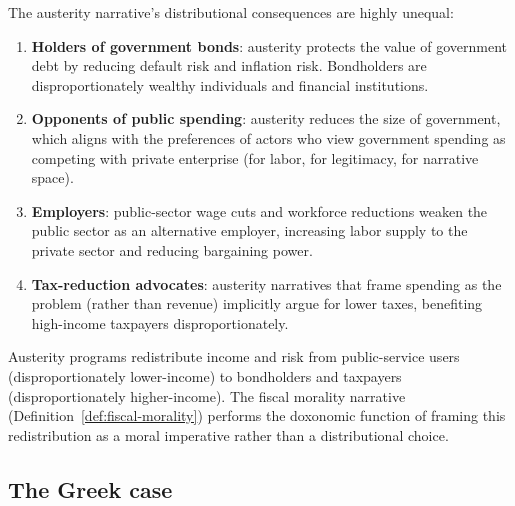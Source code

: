 The austerity narrative's distributional consequences are highly unequal:

\begin{enumerate}
  \item \textbf{Holders of government bonds}: austerity protects the value of government debt by reducing default risk and inflation risk. Bondholders are disproportionately wealthy individuals and financial institutions.

  \item \textbf{Opponents of public spending}: austerity reduces the size of government, which aligns with the preferences of actors who view government spending as competing with private enterprise (for labor, for legitimacy, for narrative space).

  \item \textbf{Employers}: public-sector wage cuts and workforce reductions weaken the public sector as an alternative employer, increasing labor supply to the private sector and reducing bargaining power.

  \item \textbf{Tax-reduction advocates}: austerity narratives that frame spending as the problem (rather than revenue) implicitly argue for lower taxes, benefiting high-income taxpayers disproportionately.
\end{enumerate}

\begin{proposition}
\label{prop:austerity-redistribution}
Austerity programs redistribute income and risk from public-service users (disproportionately lower-income) to bondholders and taxpayers (disproportionately higher-income).
The fiscal morality narrative (Definition~\ref{def:fiscal-morality}) performs the doxonomic function of framing this redistribution as a moral imperative rather than a distributional choice.
\end{proposition}

\subsection{The Greek case}


